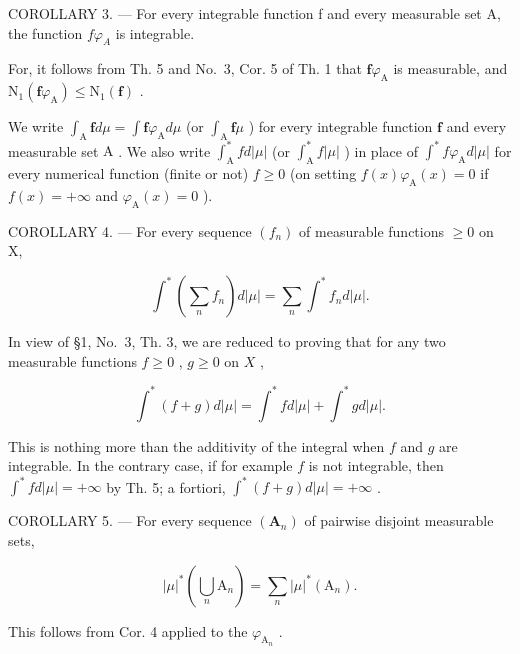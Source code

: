 COROLLARY 3. --- For every integrable function f and every measurable set A, the function \(f\varphi_{A}\) is integrable.

For, it follows from Th. 5 and No.~3, Cor. 5 of Th. 1 that \(\mathbf{f}\varphi_{\mathrm{A}}\) is measurable, and \(\mathrm{N}_1(\mathbf{f}\varphi_{\mathrm{A}}) \leqslant \mathrm{N}_1(\mathbf{f})\) .

We write \(\int_{\mathrm{A}} \mathbf{f} d\mu = \int \mathbf{f} \varphi_{\mathrm{A}} d\mu\) (or \(\int_{\mathrm{A}} \mathbf{f} \mu\) ) for every integrable function \(\mathbf{f}\) and every measurable set \(\mathrm{A}\) . We also write \(\int_{\mathrm{A}}^{*} f d|\mu|\) (or \(\int_{\mathrm{A}}^{*} f |\mu|\) ) in place of \(\int^{*} f \varphi_{\mathrm{A}} d|\mu|\) for every numerical function (finite or not) \(f \geqslant 0\) (on setting \(f(x) \varphi_{\mathrm{A}}(x) = 0\) if \(f(x) = +\infty\) and \(\varphi_{\mathrm{A}}(x) = 0\) ).

COROLLARY 4. --- For every sequence \((f_{n})\) of measurable functions \(\geqslant 0\) on X,

\[
\int^ {*} \left(\sum_ {n} f _ {n}\right) d | \mu | = \sum_ {n} \int^ {*} f _ {n} d | \mu |.\tag{1}
\]

In view of §1, No.~3, Th. 3, we are reduced to proving that for any two measurable functions \(f \geqslant 0\) , \(g \geqslant 0\) on \(X\) ,

\[
\int^ {*} (f + g) d | \mu | = \int^ {*} f d | \mu | + \int^ {*} g d | \mu |.\tag{2}
\]

This is nothing more than the additivity of the integral when \(f\) and \(g\) are integrable. In the contrary case, if for example \(f\) is not integrable, then \(\int^{*} f d|\mu| = +\infty\) by Th. 5; a fortiori, \(\int^{*}(f + g) d|\mu| = +\infty\) .

COROLLARY 5. --- For every sequence \((\mathbf{A}_{n})\) of pairwise disjoint measurable sets,

\[
| \mu | ^ {*} \left(\bigcup_ {n} \mathrm{A} _ {n}\right) = \sum_ {n} | \mu | ^ {*} (\mathrm{A} _ {n}).
\]

This follows from Cor. 4 applied to the \(\varphi_{\mathrm{A}_n}\) .
